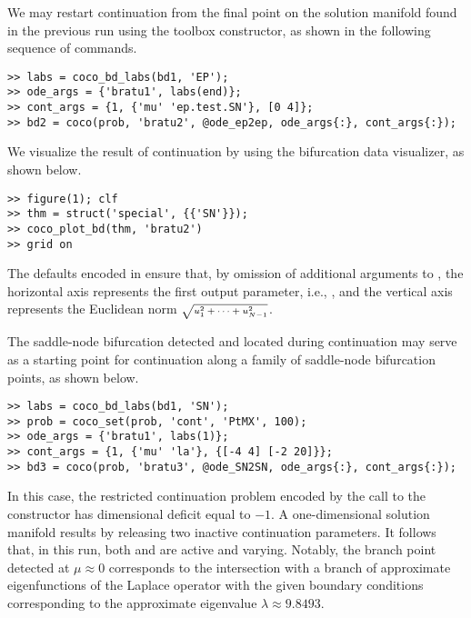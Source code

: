 We may restart continuation from the final point on the solution manifold found in the previous run using the  toolbox constructor, as shown in the following sequence of commands.
\begin{lstlisting}[language=coco-highlight]
>> labs = coco_bd_labs(bd1, 'EP');
>> ode_args = {'bratu1', labs(end)};
>> cont_args = {1, {'mu' 'ep.test.SN'}, [0 4]};
>> bd2 = coco(prob, 'bratu2', @ode_ep2ep, ode_args{:}, cont_args{:});
\end{lstlisting}
We visualize the result of continuation by using the  bifurcation data visualizer, as shown below.
\begin{lstlisting}[language=coco-highlight]
>> figure(1); clf
>> thm = struct('special', {{'SN'}});
>> coco_plot_bd(thm, 'bratu2')
>> grid on
\end{lstlisting}
The defaults encoded in  ensure that, by omission of additional arguments to , the horizontal axis represents the first output parameter, i.e., , and the vertical axis represents the Euclidean norm $\mbox{\scriptsize$\sqrt{u_1^2+\cdots+u_{N-1}^2}$}$.


The saddle-node bifurcation detected and located during continuation may serve as a starting point for continuation along a family of saddle-node bifurcation points, as shown below.
\begin{lstlisting}[language=coco-highlight]
>> labs = coco_bd_labs(bd1, 'SN');
>> prob = coco_set(prob, 'cont', 'PtMX', 100);
>> ode_args = {'bratu1', labs(1)};
>> cont_args = {1, {'mu' 'la'}, {[-4 4] [-2 20]}};
>> bd3 = coco(prob, 'bratu3', @ode_SN2SN, ode_args{:}, cont_args{:});
\end{lstlisting}
In this case, the restricted continuation problem encoded by the call to the  constructor has dimensional deficit equal to $-1$. A one-dimensional solution manifold results by releasing two inactive continuation parameters. It follows that, in this run, both  and  are active and varying. Notably, the branch point detected at $\mu\approx0$ corresponds to the intersection with a branch of approximate eigenfunctions of the Laplace operator with the given boundary conditions corresponding to the approximate eigenvalue $\lambda\approx 9.8493$.

